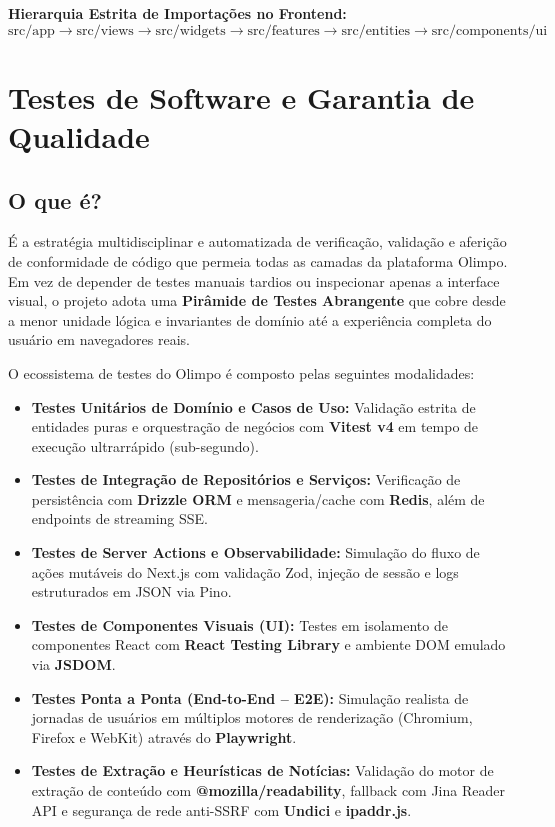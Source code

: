 \documentclass[12pt,a4paper]{article}
\begin{document}
\textbf{Hierarquia Estrita de Importações no Frontend:}
$$\text{src/app} \longrightarrow \text{src/views} \longrightarrow \text{src/widgets} \longrightarrow \text{src/features} \longrightarrow \text{src/entities} \longrightarrow \text{src/components/ui}$$

\section{Testes de Software e Garantia de Qualidade}

\subsection{O que é?}
É a estratégia multidisciplinar e automatizada de verificação, validação e aferição de conformidade de código que permeia todas as camadas da plataforma Olimpo. Em vez de depender de testes manuais tardios ou inspecionar apenas a interface visual, o projeto adota uma \textbf{Pirâmide de Testes Abrangente} que cobre desde a menor unidade lógica e invariantes de domínio até a experiência completa do usuário em navegadores reais.

O ecossistema de testes do Olimpo é composto pelas seguintes modalidades:
\begin{itemize}
  \item \textbf{Testes Unitários de Domínio e Casos de Uso:} Validação estrita de entidades puras e orquestração de negócios com \textbf{Vitest v4} em tempo de execução ultrarrápido (sub-segundo).
  \item \textbf{Testes de Integração de Repositórios e Serviços:} Verificação de persistência com \textbf{Drizzle ORM} e mensageria/cache com \textbf{Redis}, além de endpoints de streaming SSE.
  \item \textbf{Testes de Server Actions e Observabilidade:} Simulação do fluxo de ações mutáveis do Next.js com validação Zod, injeção de sessão e logs estruturados em JSON via Pino.
  \item \textbf{Testes de Componentes Visuais (UI):} Testes em isolamento de componentes React com \textbf{React Testing Library} e ambiente DOM emulado via \textbf{JSDOM}.
  \item \textbf{Testes Ponta a Ponta (End-to-End -- E2E):} Simulação realista de jornadas de usuários em múltiplos motores de renderização (Chromium, Firefox e WebKit) através do \textbf{Playwright}.
  \item \textbf{Testes de Extração e Heurísticas de Notícias:} Validação do motor de extração de conteúdo com \textbf{@mozilla/readability}, fallback com Jina Reader API e segurança de rede anti-SSRF com \textbf{Undici} e \textbf{ipaddr.js}.
\end{itemize}
\end{document}
